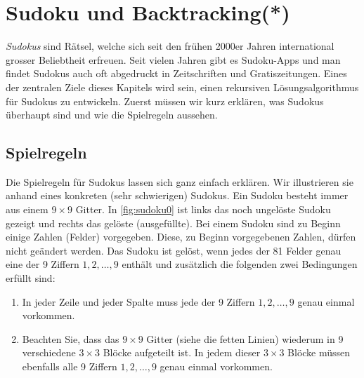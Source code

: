\chapter{Sudoku und Backtracking(*)}\label{ch:Kapitel06}
\textit{Sudokus} sind Rätsel, welche sich seit den frühen 2000er Jahren international grosser Beliebtheit erfreuen. Seit vielen Jahren gibt es Sudoku-Apps und man findet Sudokus auch oft abgedruckt in Zeitschriften und Gratiszeitungen. Eines der zentralen Ziele dieses Kapitels wird sein, einen rekursiven Lösungsalgorithmus für Sudokus zu entwickeln. Zuerst müssen wir kurz erklären, was Sudokus überhaupt sind und wie die Spielregeln aussehen.

\section{Spielregeln}
 Die Spielregeln für Sudokus lassen sich ganz einfach erklären. Wir illustrieren sie anhand eines konkreten (sehr schwierigen) Sudokus. Ein Sudoku besteht immer aus einem $9\times 9$ Gitter. In \cref{fig:sudoku0} ist links das noch ungelöste Sudoku gezeigt und rechts das gelöste (ausgefüllte). Bei einem Sudoku sind zu Beginn einige Zahlen (Felder) vorgegeben. Diese, zu Beginn vorgegebenen Zahlen, dürfen nicht geändert werden. Das Sudoku ist gelöst, wenn jedes der 81 Felder genau eine der 9 Ziffern $1,2,\ldots, 9$ enthält und zusätzlich die folgenden zwei Bedingungen erfüllt sind:
\begin{enumerate}
\item In jeder Zeile und jeder Spalte muss jede der 9 Ziffern $1,2,\ldots, 9$ genau einmal vorkommen.
\item Beachten Sie, dass das $9\times 9$ Gitter (siehe die fetten Linien) wiederum in 9 verschiedene $3\times 3$ Blöcke aufgeteilt ist. In jedem dieser $3\times 3$ Blöcke müssen ebenfalls alle 9 Ziffern $1,2,\ldots, 9$ genau einmal vorkommen.
\end{enumerate}

